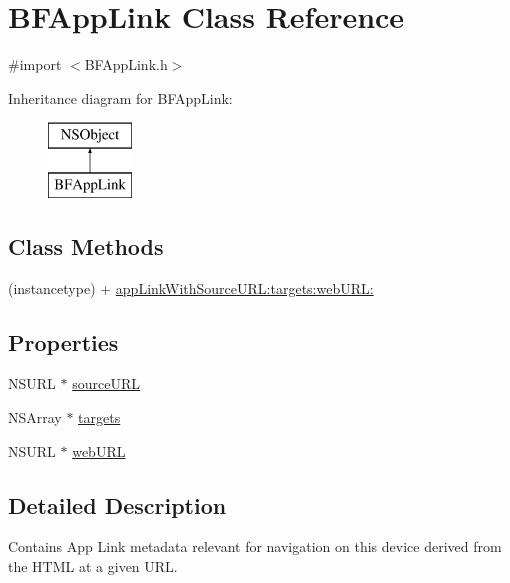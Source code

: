 \hypertarget{interface_b_f_app_link}{}\section{B\+F\+App\+Link Class Reference}
\label{interface_b_f_app_link}


{\ttfamily \#import $<$B\+F\+App\+Link.\+h$>$}

Inheritance diagram for B\+F\+App\+Link\+:\begin{figure}[H]
\begin{center}
\leavevmode
\includegraphics[height=2.000000cm]{interface_b_f_app_link}
\end{center}
\end{figure}
\subsection*{Class Methods}
\begin{DoxyCompactItemize}
\item 
(instancetype) + \hyperlink{interface_b_f_app_link_ad5ecd3c0d4ef5f4dd8e64caf2ef065ee}{app\+Link\+With\+Source\+U\+R\+L\+:targets\+:web\+U\+R\+L\+:}
\end{DoxyCompactItemize}
\subsection*{Properties}
\begin{DoxyCompactItemize}
\item 
N\+S\+U\+R\+L $\ast$ \hyperlink{interface_b_f_app_link_a4db7f973d6e7e0eab7357b3e1088a84b}{source\+U\+R\+L}
\item 
N\+S\+Array $\ast$ \hyperlink{interface_b_f_app_link_a6030f56ee163277ec6bbc6c1d1622dcf}{targets}
\item 
N\+S\+U\+R\+L $\ast$ \hyperlink{interface_b_f_app_link_a427314607aa703c9e4213385e20b5d48}{web\+U\+R\+L}
\end{DoxyCompactItemize}


\subsection{Detailed Description}
Contains App Link metadata relevant for navigation on this device derived from the H\+T\+M\+L at a given U\+R\+L. 

